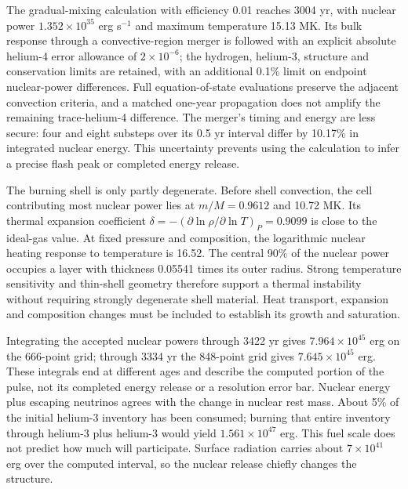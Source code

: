 \documentclass[11pt,letterpaper]{article}
\begin{document}
The gradual-mixing calculation with efficiency 0.01 reaches 3004 yr,
with nuclear power $1.352\times10^{35}$ erg s$^{-1}$ and maximum
temperature 15.13 MK. Its bulk response through a convective-region merger
is followed with an explicit absolute helium-4 error allowance of
$2\times10^{-6}$; the hydrogen, helium-3, structure and conservation limits
are retained, with an additional 0.1\% limit on endpoint nuclear-power
differences. Full equation-of-state evaluations preserve the adjacent
convection criteria, and a matched one-year propagation does not amplify
the remaining trace-helium-4 difference. The merger's timing and energy
are less secure: four and eight substeps over its 0.5 yr interval differ
by 10.17\% in integrated nuclear energy. This uncertainty prevents using
the calculation to infer a precise flash peak or completed energy release.

The burning shell is only partly degenerate. Before shell convection,
the cell contributing most nuclear power lies at $m/M=0.9612$ and 10.72 MK.
Its thermal expansion coefficient
$\delta=-(\partial\ln\rho/\partial\ln T)_P=0.9099$ is close to the ideal-gas
value. At fixed pressure and composition, the logarithmic nuclear
heating response to temperature is 16.52. The central 90\% of the nuclear
power occupies a layer with thickness 0.05541 times its outer radius.
Strong temperature sensitivity and thin-shell geometry therefore support
a thermal instability without requiring strongly degenerate shell material.
Heat transport, expansion and composition changes must be included to
establish its growth and saturation.

Integrating the accepted nuclear powers through 3422 yr gives
$7.964\times10^{45}$ erg on the 666-point grid; through 3334 yr the
848-point grid gives $7.645\times10^{45}$ erg.
These integrals end at different ages and describe the computed portion
of the pulse, not its completed energy release or a resolution error bar.
Nuclear energy plus escaping neutrinos agrees with the change in nuclear
rest mass. About 5\% of the initial helium-3 inventory has been consumed;
burning that entire inventory through helium-3 plus helium-3 would yield
$1.561\times10^{47}$ erg. This fuel scale does not predict how much will
participate. Surface radiation carries about $7\times10^{41}$ erg over
the computed interval, so the nuclear release chiefly changes the structure.
\end{document}
